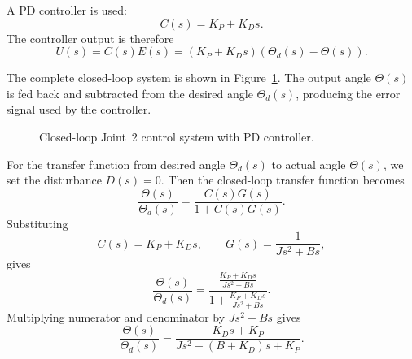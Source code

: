 \documentclass{article}
\begin{document}
A PD controller is used:
\begin{equation}
    C(s) = K_P + K_Ds.
    \label{eq:pd_controller}
\end{equation}
The controller output is therefore
\begin{equation}
    U(s) = C(s)E(s)
    =
    (K_P + K_Ds)\left(\Theta_d(s)-\Theta(s)\right).
\end{equation}

The complete closed-loop system is shown in Figure~\ref{fig:closed_loop_pd}. The output angle $\Theta(s)$ is fed back and subtracted from the desired angle $\Theta_d(s)$, producing the error signal used by the controller.

\begin{figure}[H]
    \centering
    \caption{Closed-loop Joint~2 control system with PD controller.}
    \label{fig:closed_loop_pd}
\end{figure}

For the transfer function from desired angle $\Theta_d(s)$ to actual angle $\Theta(s)$, we set the disturbance $D(s)=0$. Then the closed-loop transfer function becomes
\begin{equation}
    \frac{\Theta(s)}{\Theta_d(s)}
    =
    \frac{C(s)G(s)}{1+C(s)G(s)}.
\end{equation}
Substituting
\[
    C(s)=K_P+K_Ds,
    \qquad
    G(s)=\frac{1}{Js^2+Bs},
\]
gives
\begin{equation}
    \frac{\Theta(s)}{\Theta_d(s)}
    =
    \frac{\frac{K_P+K_Ds}{Js^2+Bs}}
    {1+\frac{K_P+K_Ds}{Js^2+Bs}}.
\end{equation}
Multiplying numerator and denominator by $Js^2+Bs$ gives
\begin{equation}
    \boxed{
    \frac{\Theta(s)}{\Theta_d(s)}
    =
    \frac{K_Ds+K_P}
    {Js^2+(B+K_D)s+K_P}
    }.
    \label{eq:closed_loop_tf}
\end{equation}
\end{document}
